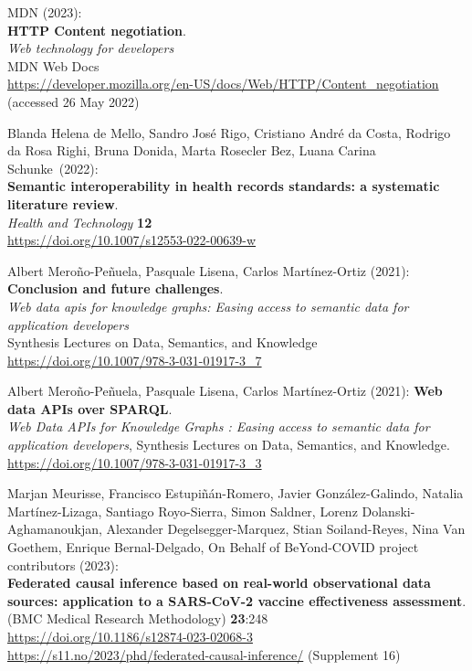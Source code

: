 \begin{thebibliography}{9}
MDN (2023): \\
\textbf{HTTP Content negotiation}.\\
\emph{Web technology for developers}\\
MDN Web Docs \\
\url{https://developer.mozilla.org/en-US/docs/Web/HTTP/Content_negotiation}
(accessed 26 May 2022)

Blanda Helena de Mello, Sandro José Rigo, Cristiano
André da Costa, Rodrigo da Rosa Righi, Bruna Donida, Marta Rosecler Bez,
Luana Carina Schunke~(2022):\\
\textbf{Semantic interoperability in health records standards: a
systematic literature review}.\\
\emph{Health and Technology} \textbf{12}\\
\url{https://doi.org/10.1007/s12553-022-00639-w}

Albert Meroño-Peñuela, Pasquale Lisena, Carlos Martínez-Ortiz (2021):
\textbf{Conclusion and future challenges}. \\
\emph{Web data apis for knowledge graphs: {Easing} access to semantic data for application
developers} \\
Synthesis Lectures on Data, Semantics, and Knowledge\\
\url{https://doi.org/10.1007/978-3-031-01917-3_7}

Albert Meroño-Peñuela, Pasquale Lisena, Carlos Martínez-Ortiz (2021):
\textbf{Web data APIs over {SPARQL}}. \\
\emph{Web Data APIs for Knowledge Graphs : Easing access to semantic data for application developers}, 
Synthesis Lectures on Data, Semantics, and Knowledge.\\
\url{https://doi.org/10.1007/978-3-031-01917-3_3}

Marjan Meurisse, Francisco Estupiñán-Romero, Javier González-Galindo, Natalia Martínez-Lizaga, Santiago Royo-Sierra, Simon Saldner, Lorenz Dolanski-Aghamanoukjan, Alexander Degelsegger-Marquez, Stian Soiland-Reyes, Nina Van Goethem, Enrique Bernal-Delgado, On Behalf of BeYond-COVID project contributors (2023):\\
\textbf{Federated causal inference based on real-world observational data sources: application to a SARS-CoV-2 vaccine effectiveness assessment}.  \\
(BMC Medical Research Methodology) \textbf{23}:248\\
\url{https://doi.org/10.1186/s12874-023-02068-3}\\
\url{https://s11.no/2023/phd/federated-causal-inference/}
(Supplement 16)


\end{thebibliography}
